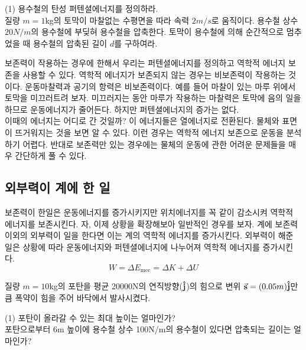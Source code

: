 \begin{flushleft}
\begin{task}
\begin{flushleft}
    \begin{tasks}[label=(\arabic*)](1)
      \task 용수철의 탄성 퍼텐셜에너지를 정의하라. \\
      \task 질량 $m=1$kg의 토막이 마찰없는 수평면을 따라 속력 $2m/s$로 움직이다. 용수철 상수 $20N/m$의 용수철에 부딪혀 용수철을 압축한다. 
      토막이 용수철에 의해 순간적으로 멈추었을 때 용수철의 압축된 길이 $d$를 구하여라.\\
   \end{tasks}
\end{flushleft}
\end{task}



보존력이 작용하는 경우에 한해서 우리는 퍼텐셜에너지를 정의하고 역학적 에너지 보존을 사용할 수 있다. 역학적 
에너지가 보존되지 않는 경우는 비보존력이 작용하는 것이다. 운동마찰력과 공기의 항력은 비보존력이다. 
예를 들어 마찰이 있는 마루 위에서 토막을 미끄러트려 보자. 미끄러지는 동안 마루가 작용하는 
마찰력은 토막에 음의 일을 하므로 운동에너지가 줄어든다. 하지만 퍼텐셜에너지의 증가는 없다. \\
이때의 에너지는 어디로 간 것일까?
이 에너지들은 열에너지로 전환된다. 물체와 표면이 뜨거워지는 것을 보면 알 수 있다. 이런 경우는 
역학적 에너지 보존으로 운동을 분석하기 어렵다.
반대로 보존력만 있는 경우에는 물체의 운동에 관한 어려운 문제들을 매우 간단하게 풀 수 있다. 
\subsection{외부력이 계에 한 일}

보존력이 한일은 운동에너지를 증가시키지만 위치에너지를 꼭 같이 감소시켜 역학적 에너지를 보존시킨다.
자, 이제 상황을 확장해보아 일반적인 경우를 보자. 계에 보존력 이외의 외부력이 일을 한다면 
이는 계의 역학적 에너지를 증가시킨다. 외부력이 해준 일은 상황에 따라 
운동에너지와 퍼텐셜에너지에 나누어져 역학적 에너지를 증가시킨다. 
\begin{equation}
  W=\Delta E_{\textrm{mec}}=\Delta K+\Delta U
\end{equation}

\begin{task}[외부력]
  \begin{flushleft}
질량 $m=10$kg의 포탄을 평균 20000N의 연직방향($\vu{j}$)의 힘으로 변위 $\va{s}=(0.05m) \vu{j}$만큼 폭약이 힘을 주어 
바닥에서 발사시켰다.  
    \begin{tasks}[label=(\arabic*)](1)
      \task 포탄이 올라갈 수 있는 최대 높이는 얼마인가? \\
      \task 포탄으로부터 6m 높이에 용수철 상수 100N/m의 용수철이 있다면 압축되는 길이는 얼마인가?\\
   \end{tasks}
\end{flushleft}
\end{task}



\end{flushleft}
